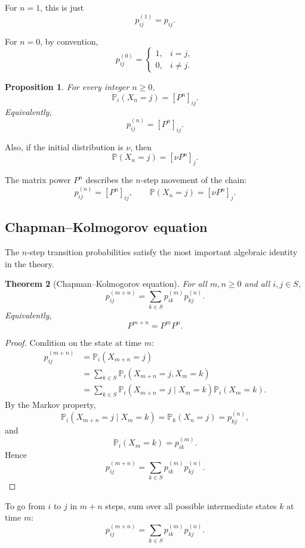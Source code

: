 \documentclass[11pt]{article}
\newtheorem{theorem}{Theorem}[section]
\newtheorem{proposition}[theorem]{Proposition}
\theoremstyle{definition}
\begin{document}
For \(n=1\), this is just
\[
p_{ij}^{(1)}=p_{ij}.
\]

For \(n=0\), by convention,
\[
p_{ij}^{(0)}=
\begin{cases}
1, & i=j,\\
0, & i\ne j.
\end{cases}
\]

\begin{proposition}
For every integer \(n\ge 0\),
\[
\mathbb P_i(X_n=j)=[P^n]_{ij}.
\]
Equivalently,
\[
p_{ij}^{(n)}=[P^n]_{ij}.
\]
\end{proposition}

Also, if the initial distribution is \(\nu\), then
\[
\mathbb P(X_n=j)=[\nu P^n]_j.
\]

\begin{keyformula}
The matrix power \(P^n\) describes the \(n\)-step movement of the chain:
\[
p_{ij}^{(n)}=[P^n]_{ij},
\qquad
\mathbb P(X_n=j)=[\nu P^n]_j.
\]
\end{keyformula}

\subsection{Chapman--Kolmogorov equation}

The \(n\)-step transition probabilities satisfy the most important algebraic identity in the theory.

\begin{theorem}[Chapman--Kolmogorov equation]
For all \(m,n\ge 0\) and all \(i,j\in S\),
\[
p_{ij}^{(m+n)}
=
\sum_{k\in S} p_{ik}^{(m)}p_{kj}^{(n)}.
\]
Equivalently,
\[
P^{m+n}=P^mP^n.
\]
\end{theorem}

\begin{proof}
Condition on the state at time \(m\):
\begin{align*}
p_{ij}^{(m+n)}
&=\mathbb P_i(X_{m+n}=j) \\
&=\sum_{k\in S}\mathbb P_i(X_{m+n}=j,X_m=k) \\
&=\sum_{k\in S}\mathbb P_i(X_{m+n}=j\mid X_m=k)\mathbb P_i(X_m=k).
\end{align*}
By the Markov property,
\[
\mathbb P_i(X_{m+n}=j\mid X_m=k)=\mathbb P_k(X_n=j)=p_{kj}^{(n)},
\]
and
\[
\mathbb P_i(X_m=k)=p_{ik}^{(m)}.
\]
Hence
\[
p_{ij}^{(m+n)}
=
\sum_{k\in S} p_{ik}^{(m)}p_{kj}^{(n)}.
\]
\end{proof}

\begin{keyformula}
To go from \(i\) to \(j\) in \(m+n\) steps, sum over all possible intermediate states \(k\) at time \(m\):
\[
p_{ij}^{(m+n)}
=
\sum_{k\in S} p_{ik}^{(m)}p_{kj}^{(n)}.
\]
\end{keyformula}
\end{document}
